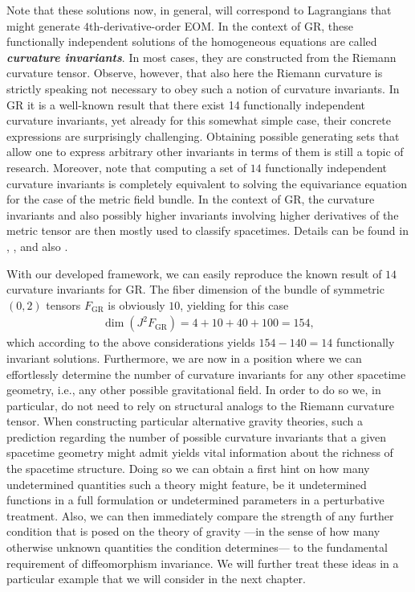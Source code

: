 Note that these solutions now, in general, will correspond to Lagrangians that might generate $4$th-derivative-order EOM. 
In the context of GR, these functionally independent solutions of the homogeneous equations are called \textit{\textbf{curvature invariants}}. In most cases, they are constructed from the Riemann curvature tensor. Observe, however, that also here the Riemann curvature is strictly speaking not necessary to obey such a notion of curvature invariants. 
In GR it is a well-known result that there exist 14 functionally independent curvature invariants, yet already for this somewhat simple case, their concrete expressions are surprisingly challenging. Obtaining possible generating sets that allow one to express arbitrary other invariants in terms of them is still a topic of research. 
Moreover, note that computing a set of $14$ functionally independent curvature invariants is completely equivalent to solving the equivariance equation for the case of the metric field bundle.
In the context of GR, the curvature invariants and also possibly higher invariants involving higher derivatives of the metric tensor are then mostly used to classify spacetimes. Details can be found in
\cite{2009CQGra..26b5013C}, \cite{Zakhary1997}, \cite{2002IJMPD..11..827C} and also \cite{doi:10.1063/1.531425}.

With our developed framework, we can easily reproduce the known result of $14$ curvature invariants for GR. The fiber dimension of the bundle of symmetric $(0,2)$ tensors $F_{\text{GR}}$ is obviously $10$, yielding for this case
\begin{align}
    \operatorname{dim}(J^2F_{\text{GR}}) = 4 + 10 + 40 + 100 = 154,
\end{align}
which according to the above considerations yields $154-140=14$ functionally invariant solutions.
Furthermore, we are now in a position where we can effortlessly determine the number of curvature invariants for any other spacetime geometry, i.e., any other possible gravitational field. In order to do so we, in particular, do not need to rely on structural analogs to the Riemann curvature tensor.
When constructing particular alternative gravity theories,
such a prediction regarding the number of possible curvature invariants that a given spacetime geometry might admit yields vital information about the richness of the spacetime structure. 
Doing so we can obtain a first hint on how many undetermined quantities such a theory might feature, be it undetermined functions in a full formulation or undetermined parameters in a perturbative treatment.
Also, we can then immediately compare the strength of any further condition that is posed on the theory of gravity ---in the sense of how many otherwise unknown quantities the condition determines---
to the fundamental requirement of diffeomorphism invariance.
We will further treat these ideas in a particular example that we will consider in the next chapter.

